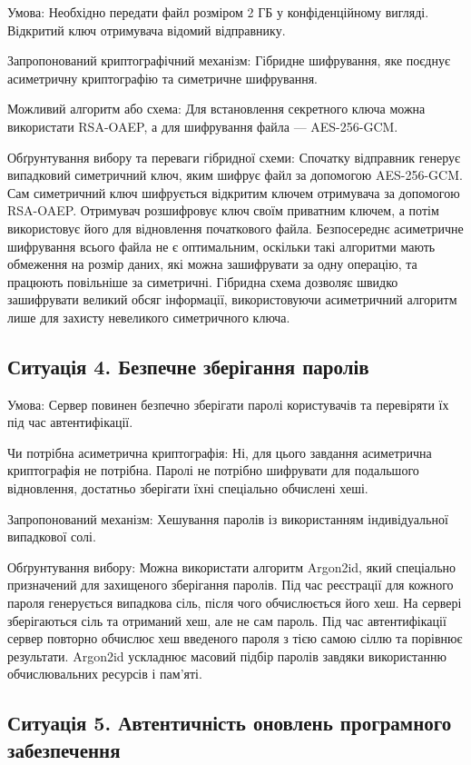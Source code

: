 Умова: Необхідно передати файл розміром 2 ГБ у конфіденційному вигляді. Відкритий ключ отримувача відомий відправнику.

Запропонований криптографічний механізм: Гібридне шифрування, яке поєднує асиметричну криптографію та симетричне шифрування.

Можливий алгоритм або схема: Для встановлення секретного ключа можна використати RSA-OAEP, а для шифрування файла — AES-256-GCM.

Обґрунтування вибору та переваги гібридної схеми: Спочатку відправник генерує випадковий симетричний ключ, 
яким шифрує файл за допомогою AES-256-GCM. Сам симетричний ключ шифрується відкритим ключем отримувача за допомогою RSA-OAEP. 
Отримувач розшифровує ключ своїм приватним ключем, а потім використовує його для відновлення початкового файла.
Безпосереднє асиметричне шифрування всього файла не є оптимальним, оскільки такі алгоритми мають обмеження на розмір даних, 
які можна зашифрувати за одну операцію, та працюють повільніше за симетричні. Гібридна схема дозволяє швидко зашифрувати великий 
обсяг інформації, використовуючи асиметричний алгоритм лише для захисту невеликого симетричного ключа.

\subsection{Ситуація 4. Безпечне зберігання паролів}

Умова: Сервер повинен безпечно зберігати паролі користувачів та перевіряти їх під час автентифікації.

Чи потрібна асиметрична криптографія: Ні, для цього завдання асиметрична криптографія не потрібна. Паролі не потрібно 
шифрувати для подальшого відновлення, достатньо зберігати їхні спеціально обчислені хеші.

Запропонований механізм: Хешування паролів із використанням індивідуальної випадкової солі.

Обґрунтування вибору: Можна використати алгоритм Argon2id, який спеціально призначений для захищеного зберігання паролів. 
Під час реєстрації для кожного пароля генерується випадкова сіль, після чого обчислюється його хеш. На сервері зберігаються сіль 
та отриманий хеш, але не сам пароль. Під час автентифікації сервер повторно обчислює хеш введеного пароля з тією самою сіллю 
та порівнює результати. Argon2id ускладнює масовий підбір паролів завдяки використанню обчислювальних ресурсів і пам'яті.

\subsection{Ситуація 5. Автентичність оновлень програмного забезпечення}

